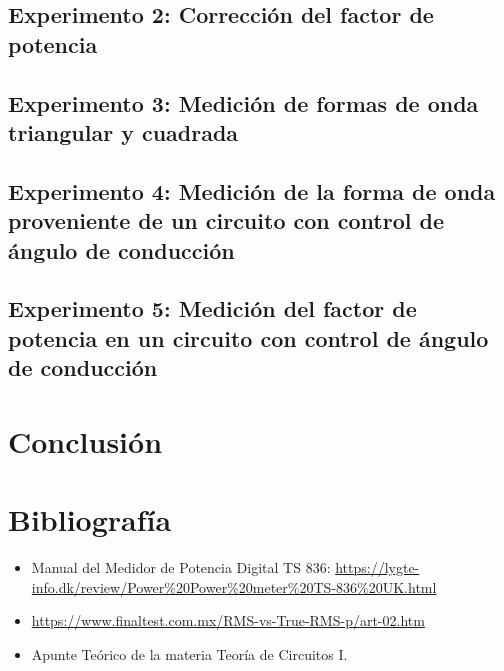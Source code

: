 \newpage
\subsection{Experimento 2: Corrección del factor de potencia}


\vspace{1.5cm}
\subsection{Experimento 3: Medición de formas de onda triangular y cuadrada}


\newpage
\subsection{Experimento 4: Medición de la forma de onda proveniente de un circuito con control de ángulo de conducción}


\newpage
\subsection{Experimento 5: Medición del factor de potencia en un circuito con control de ángulo de conducción}



\newpage
\section{Conclusión}




\vspace{1cm}
\section{Bibliografía}
\begin{itemize}
    \item Manual del Medidor de Potencia Digital TS 836: \url{https://lygte-info.dk/review/Power%20Power%20meter%20TS-836%20UK.html}

    \item \url{https://www.finaltest.com.mx/RMS-vs-True-RMS-p/art-02.htm}

    \item Apunte Teórico de la materia Teoría de Circuitos I.
\end{itemize}

%

